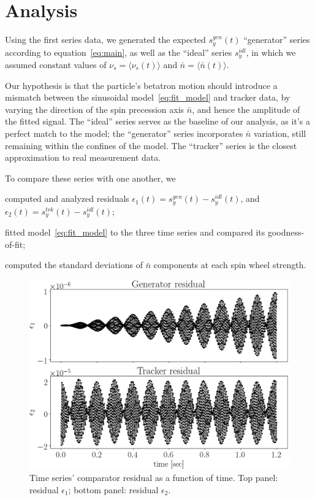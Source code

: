 \documentclass[a4paper]{jacow}
\newcommand{\avg}[1]{\langle {#1} \rangle}
\newcommand{\nbar}{\bar n}
\begin{document}
\section{Analysis}
Using the first series data, we generated the expected $s_y^{gen}(t)$ ``generator'' series according to
equation~\eqref{eq:main}, as well as the ``ideal'' series $s_y^{idl}$, in which
we assumed constant values of $\nu_s = \avg{\nu_s(t)}$ and $\nbar
=\avg{\nbar(t)}$. 

Our hypothesis is that the particle's betatron
motion should introduce a mismatch between the sinusoidal
model~\eqref{eq:fit_model} and tracker data, by varying the direction
of the spin precession axis $\nbar$, and hence the amplitude of the
fitted signal. The ``ideal'' series serves as the baseline of our
analysis, as it's a perfect match to the model; the ``generator''
series incorporates $\nbar$ variation, still remaining within the confines of
the model. The ``tracker'' series is the closest approximation to
real measurement data.

To compare these series with one another, we
\begin{inparaenum}
\item computed and analyzed residuals
  $\epsilon_1(t) = s_y^{gen}(t) - s_y^{idl}(t)$, and
  $\epsilon_2(t) = s_y^{trk}(t) - s_y^{idl}(t)$;
\item fitted model~\eqref{eq:fit_model} to the three time series and
  compared its goodness-of-fit;
\item computed the standard deviations of $\nbar$ components at each
  spin wheel strength.
\end{inparaenum}

\begin{figure}[h]
  \centering
    \includegraphics[width=\linewidth]{../img/IPAC19/residual_vs_time(both)}
  \caption{Time series' comparator residual as a function of time.
    Top panel: residual $\epsilon_1$; bottom panel: residual $\epsilon_2$.\label{fig:residuals}}
\end{figure}
\end{document}

